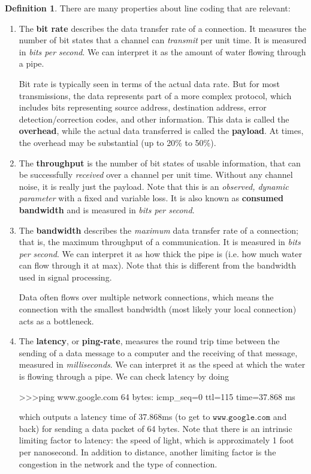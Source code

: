 \documentclass[a4paper, 12pt]{report}
\theoremstyle{remark}
\theoremstyle{definition}
\newtheorem{definition}{Definition}[section]
\begin{document}
\begin{definition}
There are many properties about line coding that are relevant:
\begin{enumerate}
    \item The \textbf{bit rate} describes the data transfer rate of a connection. It measures the number of bit states that a channel can \textit{transmit} per unit time. It is measured in \textit{bits per second}. We can interpret it as the amount of water flowing through a pipe. 
    
    Bit rate is typically seen in terms of the actual data rate. But for most transmissions, the data represents part of a more complex protocol, which includes bits representing source address, destination address, error detection/correction codes, and other information. This data is called the \textbf{overhead}, while the actual data transferred is called the \textbf{payload}. At times, the overhead may be substantial (up to 20\% to 50\%). 

    \item The \textbf{throughput} is the number of bit states of usable information, that can be successfully \textit{received} over a channel per unit time. Without any channel noise, it is really just the payload. Note that this is an \textit{observed, dynamic parameter} with a fixed and variable loss. It is also known as \textbf{consumed bandwidth} and is measured in \textit{bits per second}. 
    
    \item The \textbf{bandwidth} describes the \textit{maximum} data transfer rate of a connection; that is, the maximum throughput of a communication. It is measured in \textit{bits per second}. We can interpret it as how thick the pipe is (i.e. how much water can flow through it at max). Note that this is different from the bandwidth used in signal processing. 
    
    Data often flows over multiple network connections, which means the connection with the smallest bandwidth (most likely your local connection) acts as a bottleneck. 
    
    \item The \textbf{latency}, or \textbf{ping-rate}, measures the round trip time between the sending of a data message to a computer and the receiving of that message, measured in \textit{milliseconds}. We can interpret it as the speed at which the water is flowing through a pipe. We can check latency by doing
    \begin{python}
>>>ping www.google.com
64 bytes: icmp_seq=0 ttl=115 time=37.868 ms
    \end{python}
    which outputs a latency time of 37.868ms (to get to $\texttt{www.google.com}$ and back) for sending a data packet of 64 bytes. Note that there is an intrinsic limiting factor to latency: the speed of light, which is approximately 1 foot per nanosecond. In addition to distance, another limiting factor is the congestion in the network and the type of connection. 
\end{enumerate}
\end{definition}
\end{document}
